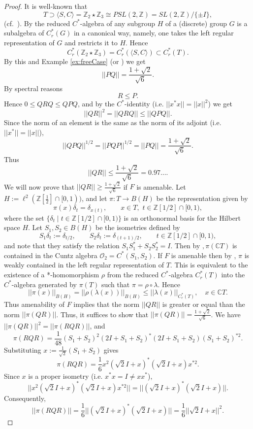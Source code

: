 \documentclass{amsart}
\newcommand{\C}{\mathbb C}
\newcommand{\Z}{\mathbb Z}
\newcommand{\fO}{\mathcal O}
\theoremstyle{definition}
\begin{document}
\begin{proof}
It is well-known that
$$T\supset\langle S,C\rangle = \Z_2\star \Z_3\cong PSL(2,\Z)=SL(2,\Z)/\{\pm I\},$$
(cf.~\cite[p.11,~Example 1.5.3]{JPS}).
By \cite[Proposition~2.5.9]{BrownOzawa} the reduced $C^*$-algebra of any subgroup $H$ of a (discrete) group $G$ is a subalgebra of  $C_r^*(G)$ in a canonical way, namely, one takes the left regular representation of $G$ and restricts it to $H$.
Hence
$$C_r^*(\Z_2\star \Z_3)=C_r^*(\langle S,C\rangle)\subset C_r^*(T).$$
By this and Example \ref{ex:freeCase} (or \cite[Remark 15]{ABHaagerup}) we get
$$||PQ||=\frac{1+\sqrt2}{\sqrt6}.$$   %
By spectral reasons
\begin{equation}\label{e:R_le_P}
R\le P.
\end{equation}
Hence $0\le QRQ\le QPQ$, and by the $C^*$-identity (i.e. $||x^*x||=||x||^2$)  we get
$$||QR||^2=||QRQ||\le ||QPQ||.$$
Since the norm of an element is the same as the norm of its adjoint (i.e. $||x^*||=||x||$),
$$||QPQ||^{1/2}=||PQP||^{1/2}=||PQ||=\frac{1+\sqrt 2}{\sqrt{6}}.$$
%
Thus
\begin{equation}
  ||QR||\le \frac{1+\sqrt 2}{\sqrt{6}}=0.97\ldots.
\end{equation}
%
We will now prove that  $||QR|| \geq \frac{1+\sqrt{2}}{\sqrt{6}}$ if $F$ is amenable.
Let $H:=\ell^2(\Z[\frac12]\cap [0,1))$, and let $\pi:T\to B(H)$ be the representation given by
$$\pi(x)\delta_t=\delta_{x(t)},\qquad x\in T,\,\, t\in \Z[1/2]\cap[0,1),$$
where the set $\{\delta_t\mid t\in   \Z[1/2]\cap[0,1)\}$ is an orthonormal basis for the Hilbert space $H$.
Let $S_1,S_2\in B(H)$ be the isometries defined by
$$S_1\delta_t:=\delta_{t/2},\qquad S_2\delta_t:=\delta_{(t+1)/2},\qquad t\in \Z[1/2]\cap [0,1),$$
and note that they satisfy the relation $S_1 S_1^*+S_2 S_2^*=I$.
Then by \cite[Proposition 4.3]{HO}$, \pi(\C T)$ is contained in the Cuntz algebra $\fO_2=C^*(S_1,S_2)$. 
If $F$ is amenable then by \cite[Proposition 4.4]{HO}, $\pi$ is weakly contained in the left regular representation of $T$.
This is equivalent to the existence of a *-homomorphism $\rho$ from the reduced $C^*$-algebra $C_r^*(T)$ into the $C^*$-algebra generated by $\pi(T)$ such that $\pi=\rho\circ \lambda$.
Hence
$$||\pi(x)||_{B(H)}=||\rho(\lambda(x))||_{B(H)}\le ||\lambda(x)||_{C_r^*(T)},\quad x\in \C T.$$
Thus amenability of $F$ implies that the norm
$||QR||$ is greater or equal than the norm $||\pi(QR)||$. Thus, it suffices to show that 
$||\pi(QR)|| = \frac{1+\sqrt{2}}{\sqrt{6}}$. We have $||\pi(QR)||^2 = ||\pi(RQR)||$,
and 
$$ \pi(RQR) = \frac1{48} (S_1 + S_2)^2 (2I + S_1 + S_2)^* (2I + S_1 + S_2) (S_1 + S_2)^{* 2}. $$ 
%
Substituting $x := \frac{1}{\sqrt{2}}(S_1 + S_2)$ gives
$$ \pi(RQR) = \frac16 x^2 (\sqrt{2}I + x)^* (\sqrt{2}I + x) x^{*2}. $$ 
Since $x$ is a proper isometry (i.e. $x^*x=I\ne xx^*$),
$$ ||x^2 (\sqrt{2}I + x)^* (\sqrt{2}I + x) x^{*2}|| = ||(\sqrt{2}I + x)^* (\sqrt{2}I + x)||. $$
Consequently, 
$$ ||\pi(RQR)|| = \frac16 ||(\sqrt{2}I + x)^* (\sqrt{2}I + x)|| 
            = \frac16 ||\sqrt{2}I + x||^2. $$
            

\end{proof}
\end{document}
